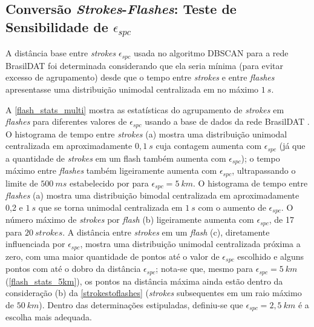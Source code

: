 \begin{anexosenv}

\partanexos

\chapter{Conversão \textit{Strokes}-\textit{Flashes}: Teste de Sensibilidade de $\epsilon_{spc}$}
\label{anexo_conversao}

A distância base entre \textit{strokes} $\epsilon_{spc}$ usada no algoritmo DBSCAN para a rede BrasilDAT foi determinada considerando que ela seria mínima (para evitar excesso de agrupamento) desde que o tempo entre \textit{strokes} e entre \textit{flashes} apresentasse uma distribuição unimodal centralizada em no máximo $1\:s$.

A \autoref{flash_stats_multi} mostra as estatísticas do agrupamento de \textit{strokes} em \textit{flashes} para diferentes valores de $\epsilon_{spc}$ usando a base de dados da rede BrasilDAT . O histograma de tempo entre \textit{strokes} (a) mostra uma distribuição unimodal centralizada em aproximadamente $0,1\:s$ cuja contagem aumenta com $\epsilon_{spc}$ (já que a quantidade de \textit{strokes} em um flash também aumenta com $\epsilon_{spc}$); o tempo máximo entre \textit{flashes} também ligeiramente aumenta com $\epsilon_{spc}$, ultrapassando o limite de $500\:ms$ estabelecido por  para $\epsilon_{spc}=5\:km$. O histograma de tempo entre \textit{flashes} (a) mostra uma distribuição bimodal centralizada em aproximadamente 0,2 e $1\:s$ que se torna unimodal centralizada em $1\:s$ com o aumento de $\epsilon_{spc}$. O número máximo de \textit{strokes} por \textit{flash} (b) ligeiramente aumenta com $\epsilon_{spc}$, de 17 para $20\:strokes$. A distância entre \textit{strokes} em um \textit{flash} (c), diretamente influenciada por $\epsilon_{spc}$, mostra uma distribuição unimodal centralizada próxima a zero, com uma maior quantidade de pontos até o valor de $\epsilon_{spc}$ escolhido e alguns pontos com até o dobro da distância $\epsilon_{spc}$; nota-se que, mesmo para $\epsilon_{spc}=5\:km$ (\autoref{flash_stats_5km}), os pontos na distância máxima ainda estão dentro da consideração (b) da \autoref{strokestoflashes} (\textit{strokes} subsequentes em um raio máximo de $50\:km$). Dentro das determinações estipuladas, definiu-se que $\epsilon_{spc}=2,5\:km$ é a escolha mais adequada.


\end{anexosenv}
